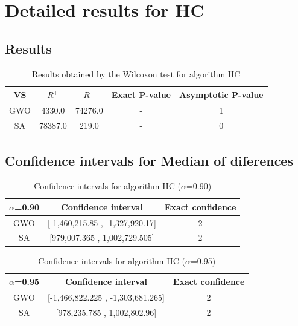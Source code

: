\documentclass[a4paper,10pt]{article}
\begin{document}
 \clearpage 


\section{Detailed results for HC}


\subsection{Results}

\begin{table}[!htp]
\centering\small
\begin{tabular}{
|c|c|c|c|c|}
\hline
 VS & $R^{+}$ & $R^{-}$ & Exact P-value & Asymptotic P-value \\ \hline 
GWO & 4330.0 & 74276.0 & - & 1\\ \hline 
SA & 78387.0 & 219.0 & - & 0\\ \hline 

\end{tabular}
\caption{Results obtained by the Wilcoxon test for algorithm HC}
\end{table}

\subsection{Confidence intervals for Median of diferences}

\begin{table}[!htp]
\centering\small
\begin{tabular}{
|c|c|c|}
\hline
 $\alpha$=0.90 & Confidence interval & Exact confidence \\ \hline 
GWO & [-1,460,215.85 , -1,327,920.17] & 2\\ \hline 
SA & [979,007.365 , 1,002,729.505] & 2\\ \hline 

\end{tabular}
\caption{Confidence intervals for algorithm HC ($\alpha$=0.90)}
\end{table}
\begin{table}[!htp]
\centering\small
\begin{tabular}{
|c|c|c|}
\hline
 $\alpha$=0.95 & Confidence interval & Exact confidence \\ \hline 
GWO & [-1,466,822.225 , -1,303,681.265] & 2\\ \hline 
SA & [978,235.785 , 1,002,802.96] & 2\\ \hline 

\end{tabular}
\caption{Confidence intervals for algorithm HC ($\alpha$=0.95)}
\end{table}

 \clearpage 
\end{document}
